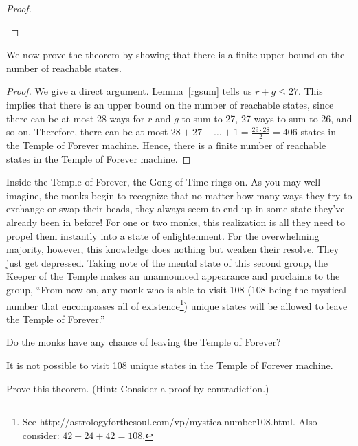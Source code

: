 \documentclass[12pt]{article}
\begin{document}
{\begin{proof}
\begin{enumerate}
\end{enumerate}
\end{proof}

We now prove the theorem by showing that there is a finite upper bound
on the number of reachable states.

\begin{proof}
  We give a direct argument. Lemma~\ref{rgsum} tells us $r+g\leq 27$.
  This implies that there is an upper bound on the number of reachable
  states, since there can be at most 28 ways for $r$ and $g$ to sum to
  27, 27 ways to sum to 26, and so on.  Therefore, there can be at
  most $28+27+\ldots+1=\frac{29\cdot 28}{2}=406$ states in the Temple
  of Forever machine. Hence, there is a finite number of reachable
  states in the Temple of Forever machine.
\end{proof}

} %

Inside the Temple of Forever, the Gong of Time rings on. As you may
well imagine, the monks begin to recognize that no matter how many
ways they try to exchange or swap their beads, they always seem to end
up in some state they've already been in before! For one or two monks,
this realization is all they need to propel them instantly into a
state of enlightenment. For the overwhelming majority, however, this
knowledge does nothing but weaken their resolve. They just get
depressed. Taking note of the mental state of this second group, the
Keeper of the Temple makes an unannounced appearance and proclaims to
the group, ``From now on, any monk who is able to visit 108 (108 being
the mystical number that encompasses all of existence\footnote{See
  http://astrologyforthesoul.com/vp/mysticalnumber108.html. Also
  consider: $42+24+42=108$.})  unique states will be allowed to leave
the Temple of Forever.''

Do the monks have any chance of leaving the Temple of Forever?

\begin{theorem}
  It is not possible to visit 108 unique states in the Temple of
  Forever machine.
\end{theorem}

Prove this theorem. (Hint: Consider a proof by contradiction.)
\end{document}
